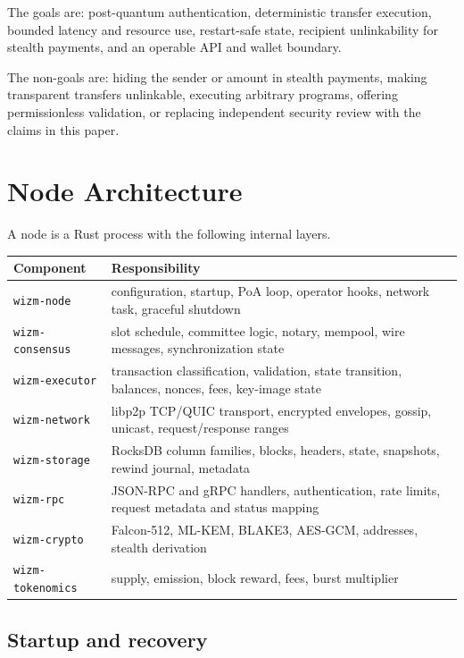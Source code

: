 \documentclass[11pt,a4paper]{article}
\begin{document}
The goals are: post-quantum authentication, deterministic transfer execution,
bounded latency and resource use, restart-safe state, recipient unlinkability
for stealth payments, and an operable API and wallet boundary.

The non-goals are: hiding the sender or amount in stealth payments, making
transparent transfers unlinkable, executing arbitrary programs, offering
permissionless validation, or replacing independent security review with the
claims in this paper.

\section{Node Architecture}

A node is a Rust process with the following internal layers.

\begin{center}
\begin{longtable}{@{}p{}p{}@{}}
\toprule
Component & Responsibility \\
\midrule
\texttt{wizm-node} & configuration, startup, PoA loop, operator hooks,
network task, graceful shutdown \\
\texttt{wizm-consensus} & slot schedule, committee logic, notary, mempool,
wire messages, synchronization state \\
\texttt{wizm-executor} & transaction classification, validation, state
transition, balances, nonces, fees, key-image state \\
\texttt{wizm-network} & libp2p TCP/QUIC transport, encrypted envelopes,
gossip, unicast, request/response ranges \\
\texttt{wizm-storage} & RocksDB column families, blocks, headers, state,
snapshots, rewind journal, metadata \\
\texttt{wizm-rpc} & JSON-RPC and gRPC handlers, authentication, rate limits,
request metadata and status mapping \\
\texttt{wizm-crypto} & Falcon-512, ML-KEM, BLAKE3, AES-GCM, addresses, stealth
derivation \\
\texttt{wizm-tokenomics} & supply, emission, block reward, fees, burst
multiplier \\
\bottomrule
\end{longtable}
\end{center}

\subsection{Startup and recovery}
\end{document}
